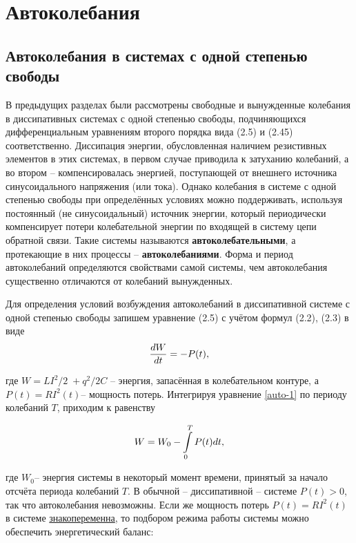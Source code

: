 \section{Автоколебания}

\subsection{Автоколебания в системах с одной степенью свободы}
В предыдущих разделах были рассмотрены свободные и вынужденные колебания в диссипативных системах с одной степенью свободы, подчиняющихся дифференциальным уравнениям второго порядка вида (2.5) и (2.45) соответственно. Диссипация энергии, обусловленная наличием резистивных элементов в этих системах, в первом случае приводила к затуханию колебаний, а во втором -- компенсировалась энергией, поступающей от
внешнего источника синусоидального напряжения (или тока). Однако колебания в системе с одной степенью свободы при определённых условиях можно поддерживать, используя постоянный (не синусоидальный) источник энергии, который периодически компенсирует потери колебательной энергии по входящей в систему цепи обратной связи. Такие системы называются \textbf{автоколебательными}, а протекающие в них процессы --
\textbf{автоколебаниями}. Форма и период автоколебаний определяются свойствами самой системы, чем автоколебания существенно отличаются от колебаний вынужденных.

Для определения условий возбуждения автоколебаний в диссипативной системе с одной степенью свободы запишем уравнение (2.5) с учётом формул (2.2), (2.3) в виде 
\begin{equation}
	\eqmark{auto-1}
	\frac{dW}{dt}=-P(t),
\end{equation}

где $W={LI^2}/{2}\;+{q^2}/{2C}$ -- энергия, запасённая в колебательном контуре, а $P(t)=R{{I}^{2}}(t)$-- мощность потерь. Интегрируя уравнение \eqref{auto-1} по периоду колебаний $T$, приходим к равенству

\begin{equation}
	\eqmark{auto-2}
	W=W_0-\int\limits_{0}^{T}P(t)dt,
\end{equation}

где $W_0$-- энергия системы в некоторый момент времени, принятый за начало отсчёта периода колебаний $T$. В обычной -- диссипативной -- системе $P(t)>0$, так что автоколебания невозможны. Если же мощность потерь $P(t)=R{{I}^{2}}(t)$ в системе \underline{знакопеременна}, то подбором режима работы системы можно обеспечить энергетический баланс:

